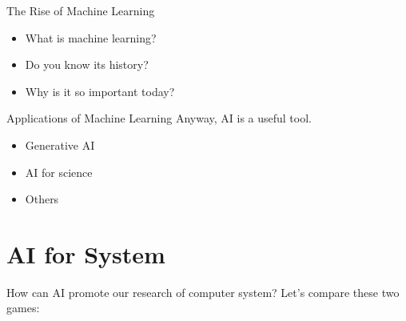 \documentclass[UTF8]{ctexbeamer}
\begin{document}
\begin{frame}{The Rise of Machine Learning}
  \begin{itemize}
    \item<2-> What is machine learning?
    \item<3-> Do you know its history?
    \item<4-> Why is it so important today?
  \end{itemize}
\end{frame}

\begin{frame}{Applications of Machine Learning}
  Anyway, AI is a useful tool.
  \begin{itemize}
    \item<2-> Generative AI
    \item<3-> AI for science
    \item<4-> Others
  \end{itemize}
\end{frame}

\section{AI for System}

\begin{frame}{How can AI promote our research of computer system?}
  Let's compare these two games:
  \begin{center} 
  \end{center} 
\end{frame}
\end{document}
